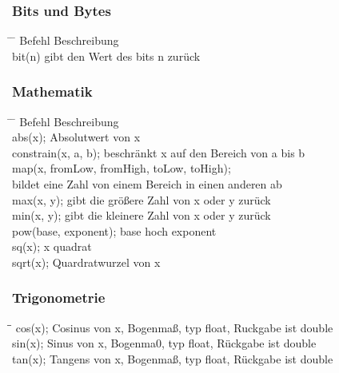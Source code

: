 \documentclass[10pt,a4paper,oneside]{article}
\begin{document}
\subsubsection{Bits und Bytes}
\begin{tabbing}
  \hspace*{1mm} \=\hspace{50mm} \= \kill
  \>Befehl \>Beschreibung \\
  \>bit(n) \>gibt den Wert des bits n zurück \\

\end{tabbing}


\subsubsection{Mathematik}
\begin{tabbing}
  \hspace*{1mm} \=\hspace{50mm} \= \kill
  \>Befehl \>Beschreibung \\
  \>abs(x); \> Absolutwert von x \\
  \>constrain(x, a, b); \> beschränkt x auf den Bereich von a bis b\\
  \>map(x, fromLow, fromHigh, toLow, toHigh); \> \\ 
  \> \> bildet eine Zahl von einem Bereich in einen anderen ab\\
  \>max(x, y); \> gibt die größere Zahl von x oder y zurück\\ 
  \>min(x, y); \> gibt die kleinere Zahl von x oder y zurück\\ 
  \>pow(base, exponent); \> base hoch exponent\\ 
  \>sq(x); \> x quadrat\\ 
  \>sqrt(x); \> Quardratwurzel von x\\ 
\end{tabbing}


\subsubsection{Trigonometrie}
\begin{tabbing}
  \hspace*{1mm} \=\hspace{50mm}\= \kill
  \>cos(x); \> Cosinus von x, Bogenmaß, typ float, Ruckgabe ist double\\ 
  \>sin(x); \> Sinus von x, Bogenma0, typ float, Rückgabe ist double\\ 
  \>tan(x); \> Tangens von x, Bogenmaß, typ float, Rückgabe ist double\\
\end{tabbing}
\end{document}

